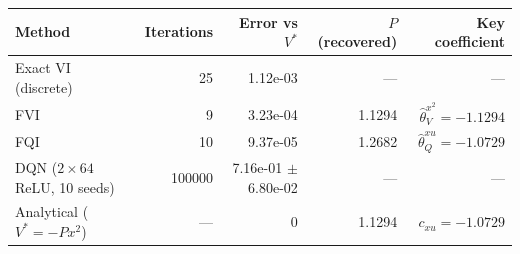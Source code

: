 \begin{tabular}{lrrrr}
\hline
Method & Iterations & Error vs $V^*$ & $P$ (recovered) & Key coefficient \\
\hline
Exact VI (discrete) & 25 & 1.12e-03 & --- & --- \\
FVI & 9 & 3.23e-04 & 1.1294 & $\hat\theta_V^{x^2} = -1.1294$ \\
FQI & 10 & 9.37e-05 & 1.2682 & $\hat\theta_Q^{xu} = -1.0729$ \\
DQN ($2 \times 64$ ReLU, 10 seeds) & 100000 & 7.16e-01 $\pm$ 6.80e-02 & --- & --- \\
Analytical ($V^* = -Px^2$) & --- & 0 & 1.1294 & $c_{xu} = -1.0729$ \\
\hline
\end{tabular}
